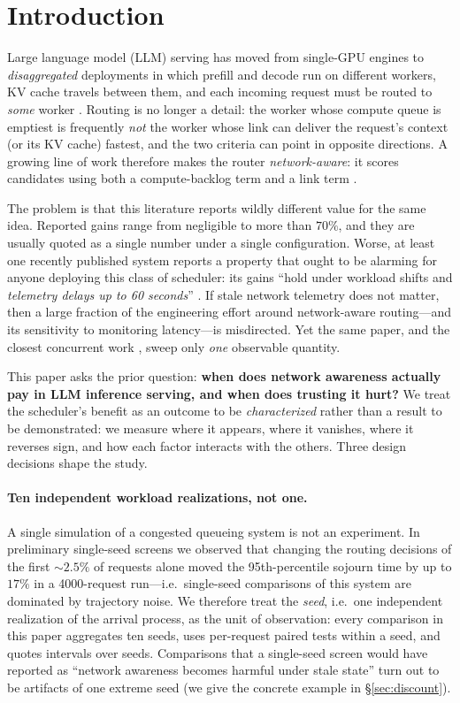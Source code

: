 \section{Introduction}
\label{sec:intro}

Large language model (LLM) serving has moved from single-GPU engines to
\emph{disaggregated} deployments in which prefill and decode run on different workers, KV cache
travels between them, and each incoming request must be routed to \emph{some} worker
\cite{distserve,splitwise,mooncake,llumnix}. Routing is no longer a detail: the worker whose
compute queue is emptiest is frequently \emph{not} the worker whose link can deliver the
request's context (or its KV cache) fastest, and the two criteria can point in opposite
directions. A growing line of work therefore makes the router \emph{network-aware}: it scores
candidates using both a compute-backlog term and a link term
\cite{cassini,vclos,helix,netkv,aegis,gensched}.

The problem is that this literature reports wildly different value for the same idea.
Reported gains range from negligible to more than $70\%$, and they are usually quoted as a
single number under a single configuration. Worse, at least one recently published system
reports a property that ought to be alarming for anyone deploying this class of scheduler:
its gains ``hold under workload shifts and \emph{telemetry delays up to 60 seconds}''
\cite{aegis}. If stale network telemetry does not matter, then a large fraction of the
engineering effort around network-aware routing---and its sensitivity to monitoring
latency---is misdirected. Yet the same paper, and the closest concurrent work
\cite{netkv}, sweep only \emph{one} observable quantity.

This paper asks the prior question: \textbf{when does network awareness actually pay in LLM
inference serving, and when does trusting it hurt?} We treat the scheduler's benefit as an
outcome to be \emph{characterized} rather than a result to be demonstrated: we measure where it
appears, where it vanishes, where it reverses sign, and how each factor interacts with the
others. Three design decisions shape the study.

\paragraph{Ten independent workload realizations, not one.}
A single simulation of a congested queueing system is not an experiment. In preliminary
single-seed screens we observed that changing the routing decisions of the first $\sim2.5\%$ of
requests alone moved the 95th-percentile sojourn time by up to $17\%$ in a \num{4000}-request
run---i.e.~single-seed comparisons of this system are dominated by trajectory noise. We therefore
treat the \emph{seed}, i.e.~one independent realization of the arrival process, as the unit of
observation: every comparison in this paper aggregates ten seeds, uses per-request paired tests
within a seed, and quotes intervals over seeds. Comparisons that a single-seed screen would have
reported as ``network awareness becomes harmful under stale state'' turn out to be artifacts of
one extreme seed (we give the concrete example in \S\ref{sec:discount}).

